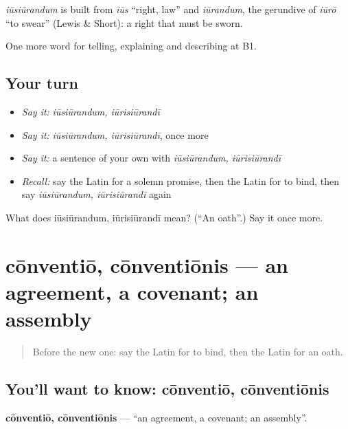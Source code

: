 \begin{cousinweb}
\emph{iūsiūrandum} is built from \emph{iūs} \textquotedblleft{}right, law\textquotedblright{} and \emph{iūrandum}, the gerundive of \emph{iūrō} \textquotedblleft{}to swear\textquotedblright{} (Lewis \& Short): a right that must be sworn.
\end{cousinweb}

\begin{grammarlens}[title={What you've built}]
One more word for telling, explaining and describing at B1.
\end{grammarlens}

\subsection*{Your turn}
\begin{itemize}
\raggedright
  \item \emph{Say it:} \emph{iūsiūrandum, iūrisiūrandī}
  \item \emph{Say it:} \emph{iūsiūrandum, iūrisiūrandī}, once more
  \item \emph{Say it:} a sentence of your own with \emph{iūsiūrandum, iūrisiūrandī}
  \item \emph{Recall:} say the Latin for a solemn promise, then the Latin for to bind, then say \emph{iūsiūrandum, iūrisiūrandī} again
\end{itemize}

\begin{tcolorbox}[breakable,colback=teal!4,colframe=teal!35!black,title={Before you move on}]
What does iūsiūrandum, iūrisiūrandī mean? (\textquotedblleft{}An oath\textquotedblright{}.) Say it once more.
\end{tcolorbox}
\section[cōnventiō, cōnventiōnis]{cōnventiō, cōnventiōnis — an agreement, a covenant; an assembly}

\label{lesson:LA-C397-conventio}



\begin{quote}
Before the new one: say the Latin for to bind, then the Latin for an oath.
\end{quote}

\subsection*{You'll want to know: cōnventiō, cōnventiōnis}
\textbf{cōnventiō, cōnventiōnis} — \textquotedblleft{}an agreement, a covenant; an assembly\textquotedblright{}.

